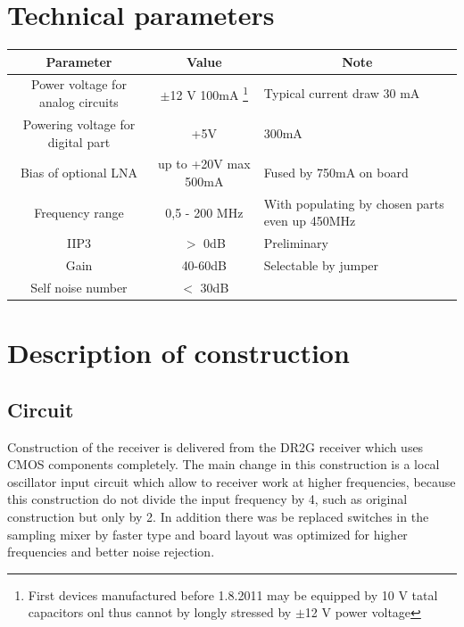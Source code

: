 \documentclass[12pt,a4paper,oneside]{article}
\begin{document}
\section{Technical parameters}
\begin{savenotes}
\begin{table}[htbp]
\begin{center}
\begin{tabular}{|c|c|p{5cm}|}
\hline
\multicolumn{1}{|c|}{Parameter} & \multicolumn{1}{|c|}{Value} & \multicolumn{1}{|c|}{Note} \\ \hline
Power voltage for analog circuits & $\pm$12 V 100mA \footnote{First devices manufactured before 1.8.2011 may be equipped by 10 V tatal capacitors onl thus cannot by longly stressed by $\pm$12 V power voltage } &  Typical current draw 30 mA \\ \hline
Powering voltage for digital part & +5V &  300mA \\ \hline
Bias of optional LNA & up to +20V max 500mA &   Fused by 750mA on board \\ \hline
Frequency range  & 0,5 - 200 MHz & With populating by chosen parts even up 450MHz \\ \hline
IIP3  & $>$ 0dB & Preliminary \\ \hline
Gain & 40-60dB & Selectable by jumper \\ \hline
Self noise number & $<$ 30dB & \\ \hline
\end{tabular}
\end{center}
\end{table}
\end{savenotes}

\newpage
\section{Description of construction}

\subsection{Circuit}
Construction  of the receiver is delivered from the DR2G receiver \cite{DR2G} which uses CMOS components completely. The main change in this construction is a local oscillator input circuit which allow to receiver work at higher frequencies, because this construction do not divide the input frequency by 4, such as original construction but only by 2. In addition there was be replaced switches in the sampling mixer by faster type and board layout was optimized for higher frequencies and better noise rejection.
\end{document}
